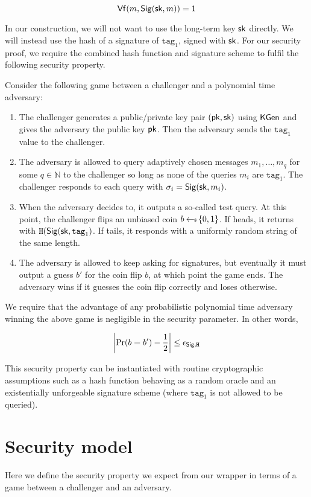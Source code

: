 \documentclass{article}
\begin{document}
$$\mathsf{Vf} (m , \mathsf{Sig} ({\mathsf{sk}, m})) = 1$$

In our construction, we will not want to use the long-term key $\mathsf{sk}$ directly. We will instead use the hash of a signature of $\texttt{tag}_1$, signed with $\mathsf{sk}$. For our security proof, we require the combined hash function and signature scheme to fulfil the following  security property.

Consider the following game between a challenger and a polynomial time adversary:

\begin{enumerate}
\item The challenger generates a public/private key pair $(\mathsf{pk}, \mathsf{sk})$ using $\mathsf{KGen}$ and gives the adversary the public key $\mathsf{pk}$. Then the adversary sends the $\mathrm{\texttt{tag}_1}$ value to the challenger.

\item The adversary is allowed to query adaptively chosen messages $m_1,
	\dots , m_q$ for some $q \in \mathbb{N}$ to the challenger so long as none of the queries $m_i$ are $\texttt{tag}_1$. The
		challenger responds to each query with $\sigma_{i}=
		\mathsf{Sig}{(\mathsf{sk}, m_i})$. 

\item When the adversary decides to, it outputs a so-called test query. At this point, the challenger flips an unbiased coin $b \hskip2.3pt{\gets\!\!\mbox{\tiny${\$}$\normalsize}}\, \{0, 1\}$. If heads, it returns with $ \texttt{H}(\mathsf{Sig} (\mathsf{sk}, \mathrm{\texttt{tag}_1})$. If tails, it responds with a uniformly random string of the same length.

\item The adversary is allowed to keep asking for signatures, but eventually it must output a guess $b'$ for the coin flip $b$, at which point the game ends. The adversary wins if it guesses the coin flip correctly and loses otherwise.
\end{enumerate}

We require that the advantage of any probabilistic polynomial time adversary winning the above game is negligible in the security parameter. In other words,

$$\left \vert \Pr(b = b') -\frac{1}{2} \right \vert \le \epsilon_{\mathsf{Sig}, \texttt{H}}$$

This security property can be instantiated with routine cryptographic assumptions such as a hash function behaving as a random oracle and an existentially unforgeable signature scheme (where $\texttt{tag}_1$ is not allowed to be queried).

\section{Security model} \label{sec:model}
Here we define the security property we expect from our wrapper in terms of a game between a challenger and an adversary.
\end{document}
